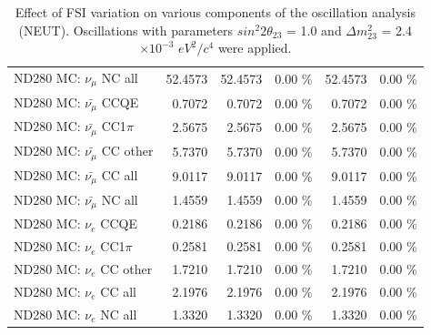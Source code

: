 \begin{table}
\begin{tabular}{| l | r | r  r | r  r |}
                                          ND280 MC: $\nu_{\mu}$ NC all &         52.4573 &         52.4573 &  0.00 \%  &         52.4573 &  0.00 \%  \\ 
                                      ND280 MC: $\bar{\nu_{\mu}}$ CCQE &          0.7072 &          0.7072 &  0.00 \%  &          0.7072 &  0.00 \%  \\ 
                                  ND280 MC: $\bar{\nu_{\mu}}$ CC1$\pi$ &          2.5675 &          2.5675 &  0.00 \%  &          2.5675 &  0.00 \%  \\ 
                                  ND280 MC: $\bar{\nu_{\mu}}$ CC other &          5.7370 &          5.7370 &  0.00 \%  &          5.7370 &  0.00 \%  \\ 
                                    ND280 MC: $\bar{\nu_{\mu}}$ CC all &          9.0117 &          9.0117 &  0.00 \%  &          9.0117 &  0.00 \%  \\ 
                                    ND280 MC: $\bar{\nu_{\mu}}$ NC all &          1.4559 &          1.4559 &  0.00 \%  &          1.4559 &  0.00 \%  \\ 
                                              ND280 MC: $\nu_{e}$ CCQE &          0.2186 &          0.2186 &  0.00 \%  &          0.2186 &  0.00 \%  \\ 
                                          ND280 MC: $\nu_{e}$ CC1$\pi$ &          0.2581 &          0.2581 &  0.00 \%  &          0.2581 &  0.00 \%  \\ 
                                          ND280 MC: $\nu_{e}$ CC other &          1.7210 &          1.7210 &  0.00 \%  &          1.7210 &  0.00 \%  \\ 
                                            ND280 MC: $\nu_{e}$ CC all &          2.1976 &          2.1976 &  0.00 \%  &          2.1976 &  0.00 \%  \\ 
                                            ND280 MC: $\nu_{e}$ NC all &          1.3320 &          1.3320 &  0.00 \%  &          1.3320 &  0.00 \%  \\ 
\hline
\end{tabular}
\caption{ 
  Effect of FSI variation
  on various components of the oscillation analysis (NEUT).
  Oscillations with parameters $sin^{2}2\theta_{23}$ = 1.0 and $\Delta m^{2}_{23}$ = 2.4$\times10^{-3}$ $eV^{2}/c^{4}$ were applied.  
}
\label{tab:neut_nuclear_effect}
\end{table}




